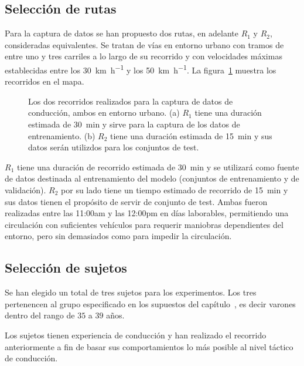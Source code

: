 \subsection{Selección de rutas}

Para la captura de datos se han propuesto dos rutas, en adelante $R_1$ y $R_2$, consideradas equivalentes. Se tratan de vías en entorno urbano con tramos de entre uno y tres carriles a lo largo de su recorrido y con velocidades máximas establecidas entre los \SI{30}{\km\per\hour} y los \SI{50}{\km\per\hour}. La figura~\ref{fig:proposed-routes} muestra los recorridos en el mapa.

\begin{figure}
	\centering
	\qquad
	\caption[Dos recorridos para la captura de datos de conducción]{Los dos recorridos realizados para la captura de datos de conducción, ambos en entorno urbano. (a) $R_1$ tiene una duración estimada de \SI{30}{\minute} y sirve para la captura de los datos de entrenamiento. (b) $R_2$ tiene una duración estimada de \SI{15}{\minute} y sus datos serán utilizdos para los conjuntos de test.}
	\label{fig:proposed-routes}
\end{figure}

$R_1$ tiene una duración de recorrido estimada de \SI{30}{\minute} y se utilizará como fuente de datos destinada al entrenamiento del modelo (conjuntos de entrenamiento y de validación). $R_2$ por su lado tiene un tiempo estimado de recorrido de \SI{15}{\minute} y sus datos tienen el propósito de servir de conjunto de test. Ambas fueron realizadas entre las 11:00am y las 12:00pm en días laborables, permitiendo una circulación con suficientes vehículos para requerir maniobras dependientes del entorno, pero sin demasiados como para impedir la circulación.

\subsection{Selección de sujetos}

Se han elegido un total de tres sujetos para los experimentos. Los tres pertenencen al grupo especificado en los supuestos del capítulo~, es decir varones dentro del rango de $35$ a $39$ años.

Los sujetos tienen experiencia de conducción y han realizado el recorrido anteriormente a fin de basar sus comportamientos lo más posible al nivel táctico de conducción.

